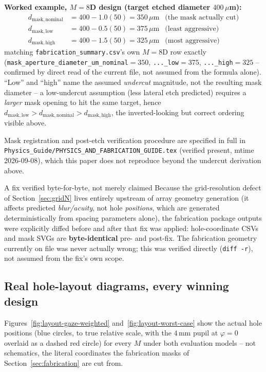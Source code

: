 \textbf{Worked example, $M=8$D design (target etched diameter $400\,\mu$m):}
\begin{align}
d_{\mathrm{mask,nominal}} &= 400-1.0(50) = 350\,\mu\mathrm{m} & \text{(the mask actually cut)}\\
d_{\mathrm{mask,low}} &= 400-0.5(50) = 375\,\mu\mathrm{m} & \text{(least aggressive)}\\
d_{\mathrm{mask,high}} &= 400-1.5(50) = 325\,\mu\mathrm{m} & \text{(most aggressive)}
\end{align}
matching \texttt{fabrication\_summary.csv}'s own $M=8$D row exactly
(\texttt{mask\_aperture\_diameter\_um\_nominal}$=350$, \texttt{...\_low}$=375$,
\texttt{...\_high}$=325$ -- confirmed by direct read of the current file, not assumed
from the formula alone). ``Low'' and ``high'' name the assumed \emph{undercut}
magnitude, not the resulting mask diameter -- a low-undercut assumption (less lateral
etch predicted) requires a \emph{larger} mask opening to hit the same target, hence
$d_{\mathrm{mask,low}} > d_{\mathrm{mask,nominal}} > d_{\mathrm{mask,high}}$, the
inverted-looking but correct ordering visible above.

Mask registration and post-etch verification procedure are specified in full in
\texttt{Physics\_Guide/PHYSICS\_AND\_FABRICATION\_GUIDE.tex} (verified present, mtime
2026-09-08), which this paper does not reproduce beyond the undercut derivation above.

\begin{keybox}{A fix verified byte-for-byte, not merely claimed}
Because the grid-resolution defect of Section~\ref{sec:gridN} lives entirely upstream of
array geometry generation (it affects predicted \emph{blur/acuity}, not hole
\emph{positions}, which are generated deterministically from spacing parameters alone),
the fabrication package outputs were explicitly diffed before and after that fix was
applied: hole-coordinate CSVs and mask SVGs are \textbf{byte-identical} pre- and
post-fix. The fabrication geometry currently on file was never actually wrong; this was
verified directly (\texttt{diff -r}), not assumed from the fix's own scope.
\end{keybox}

\subsection{Real hole-layout diagrams, every winning design}
\label{sec:layout-diagrams}
Figures~\ref{fig:layout-gaze-weighted} and~\ref{fig:layout-worst-case} show the actual
hole positions (blue circles, to true relative scale, with the $4$\,mm pupil at
$\varphi=0$ overlaid as a dashed red circle) for every $M$ under both evaluation
models -- not schematics, the literal coordinates the fabrication masks of
Section~\ref{sec:fabrication} are cut from.

